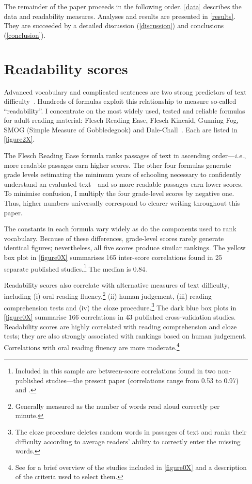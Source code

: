 The remainder of the paper proceeds in the following order. \autoref{data} describes the data and readability measures. Analyses and results are presented in \autoref{results}. They are succeeded by a detailed discussion (\autoref{discussion}) and conclusions (\autoref{conclusion}).

\section{Readability scores}
\label{measuringreadability}

Advanced vocabulary and complicated sentences are two strong predictors of text difficulty~\citep{Chall1995}. Hundreds of formulas exploit this relationship to measure so-called ``readability''. I concentrate on the most widely used, tested and reliable formulas for adult reading material: Flesch Reading Ease, Flesch-Kincaid, Gunning Fog, SMOG (Simple Measure of Gobbledegook) and Dale-Chall~\citep{DuBay2004}. Each are listed in \autoref{figure2X}.



The Flesch Reading Ease formula ranks passages of text in ascending order---\emph{i.e.}, more readable passages earn higher scores. The other four formulas generate grade levels estimating the minimum years of schooling necessary to confidently understand an evaluated text---and so more readable passages earn lower scores. To minimise confusion, I multiply the four grade-level scores by negative one. Thus, higher numbers universally correspond to clearer writing throughout this paper.

The constants in each formula vary widely as do the components used to rank vocabulary. Because of these differences, grade-level scores rarely generate identical figures; nevertheless, all five scores produce similar rankings. The yellow box plot in \autoref{figure0X} summarises 165 inter-score correlations found in 25 separate published studies.\footnote{Included in this sample are between-score correlations found in two non-published studies---the present paper (correlations range from 0.53 to 0.97) and  \citet{Benoit2017}.} The median is 0.84.

Readability scores also correlate with alternative measures of text difficulty, including (i) oral reading fluency,\footnote{Generally measured as the number of words read aloud correctly per minute.} (ii) human judgement, (iii) reading comprehension tests and (iv) the cloze procedure.\footnote{The cloze procedure deletes random words in passages of text and ranks their difficulty according to average readers' ability to correctly enter the missing words.} The dark blue box plots in \autoref{figure0X} summarise 166 correlations in 43 published cross-validation studies. Readability scores are highly correlated with reading comprehension and cloze tests; they are also strongly associated with rankings based on human judgement. Correlations with oral reading fluency are more moderate.\footnote{See  for a brief overview of the studies included in \autoref{figure0X} and a description of the criteria used to select them.}

